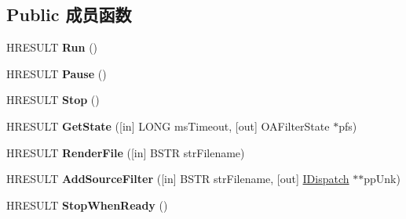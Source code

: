 \subsection*{Public 成员函数}
\begin{DoxyCompactItemize}
\item 
\mbox{\label{interface_quartz_type_lib_1_1_i_media_control_af32171e1544f009021116dad54aece74}} 
H\+R\+E\+S\+U\+LT {\bfseries Run} ()
\item 
\mbox{\label{interface_quartz_type_lib_1_1_i_media_control_a1a47a2d7b766f56af635eb0f0e4e1c25}} 
H\+R\+E\+S\+U\+LT {\bfseries Pause} ()
\item 
\mbox{\label{interface_quartz_type_lib_1_1_i_media_control_a4d6c67fb1fb243f070059d0e79634f99}} 
H\+R\+E\+S\+U\+LT {\bfseries Stop} ()
\item 
\mbox{\label{interface_quartz_type_lib_1_1_i_media_control_aff6a9e171f3c6855844b9a8c4da23f6c}} 
H\+R\+E\+S\+U\+LT {\bfseries Get\+State} (\mbox{[}in\mbox{]} L\+O\+NG ms\+Timeout, \mbox{[}out\mbox{]} O\+A\+Filter\+State $\ast$pfs)
\item 
\mbox{\label{interface_quartz_type_lib_1_1_i_media_control_a7c6ad8d97203e37e49a6bd6757d76680}} 
H\+R\+E\+S\+U\+LT {\bfseries Render\+File} (\mbox{[}in\mbox{]} B\+S\+TR str\+Filename)
\item 
\mbox{\label{interface_quartz_type_lib_1_1_i_media_control_a1fb303c001ca8c5ee15c6eaf8ab9ffbb}} 
H\+R\+E\+S\+U\+LT {\bfseries Add\+Source\+Filter} (\mbox{[}in\mbox{]} B\+S\+TR str\+Filename, \mbox{[}out\mbox{]} \hyperlink{interface_i_dispatch}{I\+Dispatch} $\ast$$\ast$pp\+Unk)
\item 
\mbox{\label{interface_quartz_type_lib_1_1_i_media_control_add7113fea96040c4b34733f96f98b503}} 
H\+R\+E\+S\+U\+LT {\bfseries Stop\+When\+Ready} ()
\end{DoxyCompactItemize}
